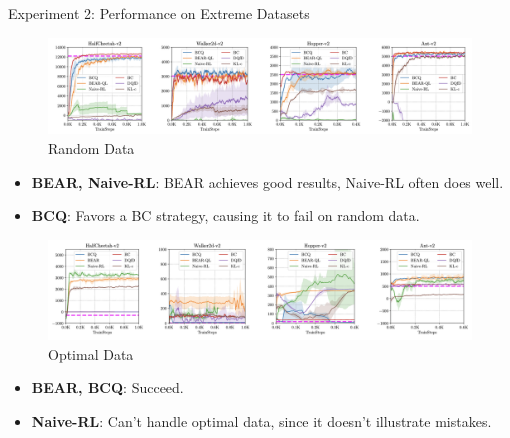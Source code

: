 \documentclass[11pt]{beamer}
\newcommand{\tb}[1]{\textbf{#1}}
\begin{document}
\begin{frame}{Experiment 2: Performance on Extreme Datasets}
        \begin{figure}
            \includegraphics[width=\textwidth]{Figure5Bottom.png}
            \caption{Random Data}
        \end{figure}
        \begin{itemize}
            \item \tb{BEAR, Naive-RL}: BEAR achieves good results, Naive-RL often does well.
            \item \tb{BCQ}: Favors a BC strategy, causing it to fail on random data.
        \end{itemize}
        \begin{figure}
            \includegraphics[width=\textwidth]{Figure5Top.png}
            \caption{Optimal Data}
        \end{figure}
        \begin{itemize}
            \item \tb{BEAR, BCQ}: Succeed.
            \item \tb{Naive-RL}: Can't handle optimal data, since it doesn't illustrate mistakes.
        \end{itemize}
    \end{frame}
\end{document}
